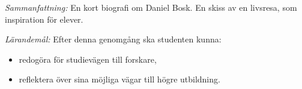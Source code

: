 \emph{Sammanfattning:}
En kort biografi om Daniel Bosk.
En skiss av en livsresa, som inspiration för elever.

\emph{Lärandemål:}
Efter denna genomgång ska studenten kunna:
\begin{itemize}
  \item redogöra för studievägen till forskare,
  \item reflektera över sina möjliga vägar till högre utbildning.
\end{itemize}

